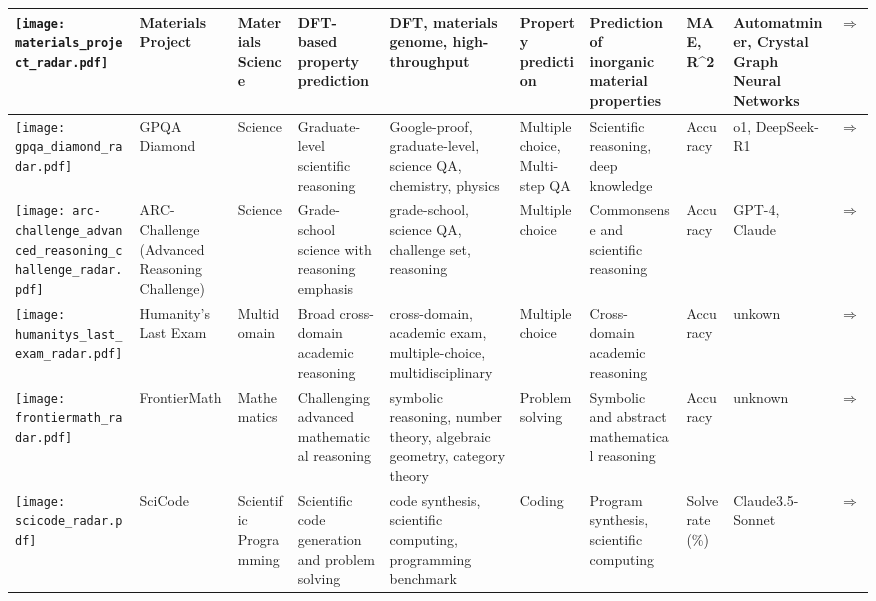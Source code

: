 \begin{landscape}
{\begin{longtable}{|p{}|p{}|p{}|p{}|p{}|p{}|p{}|p{}|p{}|p{}|}
\texttt{[image: materials\_project\_radar.pdf]} & Materials Project & Materials Science & DFT-based property prediction & DFT, materials genome, high-throughput & Property prediction & Prediction of inorganic material properties & MAE, R{\textasciicircum}2 & Automatminer, Crystal Graph Neural Networks & \cite{jain2013materials}\href{https://materialsproject.org/}{$\Rightarrow$} \\ \hline
\texttt{[image: gpqa\_diamond\_radar.pdf]} & GPQA Diamond & Science & Graduate-level scientific reasoning & Google-proof, graduate-level, science QA, chemistry, physics & Multiple choice, Multi-step QA & Scientific reasoning, deep knowledge & Accuracy & o1, DeepSeek-R1 & \cite{rein2023gpqagraduatelevelgoogleproofqa}\href{https://arxiv.org/abs/2311.12022}{$\Rightarrow$} \\ \hline
\texttt{[image: arc-challenge\_advanced\_reasoning\_challenge\_radar.pdf]} & ARC-Challenge (Advanced Reasoning Challenge) & Science & Grade-school science with reasoning emphasis & grade-school, science QA, challenge set, reasoning & Multiple choice & Commonsense and scientific reasoning & Accuracy & GPT-4, Claude & \cite{clark2018think}\href{https://allenai.org/data/arc}{$\Rightarrow$} \\ \hline
\texttt{[image: humanitys\_last\_exam\_radar.pdf]} & Humanity's Last Exam & Multidomain & Broad cross-domain academic reasoning & cross-domain, academic exam, multiple-choice, multidisciplinary & Multiple choice & Cross-domain academic reasoning & Accuracy & unkown & \cite{phan2025humanitysexam}\href{https://arxiv.org/abs/2501.14249}{$\Rightarrow$} \\ \hline
\texttt{[image: frontiermath\_radar.pdf]} & FrontierMath & Mathematics & Challenging advanced mathematical reasoning & symbolic reasoning, number theory, algebraic geometry, category theory & Problem solving & Symbolic and abstract mathematical reasoning & Accuracy & unknown & \cite{glazer2024frontiermathbenchmarkevaluatingadvanced}\href{https://arxiv.org/abs/2411.04872}{$\Rightarrow$} \\ \hline
\texttt{[image: scicode\_radar.pdf]} & SciCode & Scientific Programming & Scientific code generation and problem solving & code synthesis, scientific computing, programming benchmark & Coding & Program synthesis, scientific computing & Solve rate (\%) & Claude3.5-Sonnet & \cite{tian2024scicoderesearchcodingbenchmark}\href{https://arxiv.org/abs/2407.13168}{$\Rightarrow$} \\ \hline

\end{longtable}}
\end{landscape}
